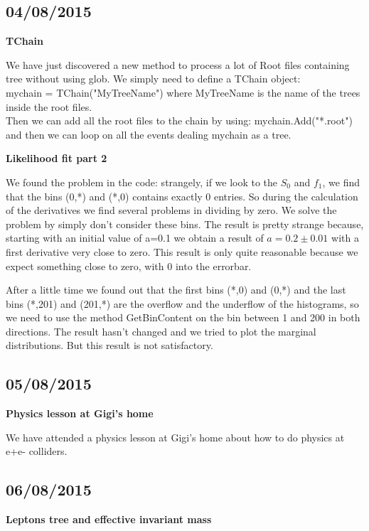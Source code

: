 \subsection{04/08/2015}

\textbf{TChain}

We have just discovered a new method to process a lot of Root files containing tree without using glob.
We simply need to define a TChain object:\\
mychain = TChain("MyTreeName")
where MyTreeName is the name of the trees inside the root files.\\
Then we can add all the root files to the chain by using:
mychain.Add("*.root")\\
and then we can loop on all the events dealing mychain as a tree.

\textbf{Likelihood fit part 2}

We found the problem in the code: strangely, if we look to the $S_0$ and $f_1$, we find that the bins (0,*) and (*,0) contains exactly 0 entries. So during the calculation of the derivatives we find several problems in dividing by zero. We solve the problem by simply don't consider these bins. The result is pretty strange because, starting with an initial value of a=0.1 we obtain a result of $a=0.2 \pm 0.01$ with a first derivative very close to zero. This result is only quite reasonable because we expect something close to zero, with 0 into the errorbar.

After a little time we found out that the first bins (*,0) and (0,*) and the last bins (*,201) and (201,*) are the overflow and the underflow of the histograms, so we need to use the method GetBinContent on the bin between 1 and 200 in both directions. The result hasn't changed and we tried to plot the marginal distributions. But this result is not satisfactory.

\subsection{05/08/2015}

\textbf{Physics lesson at Gigi's home}

We have attended a physics lesson at Gigi's home about how to do physics at e+e- colliders.

\subsection{06/08/2015}

\textbf{Leptons tree and effective invariant mass}

